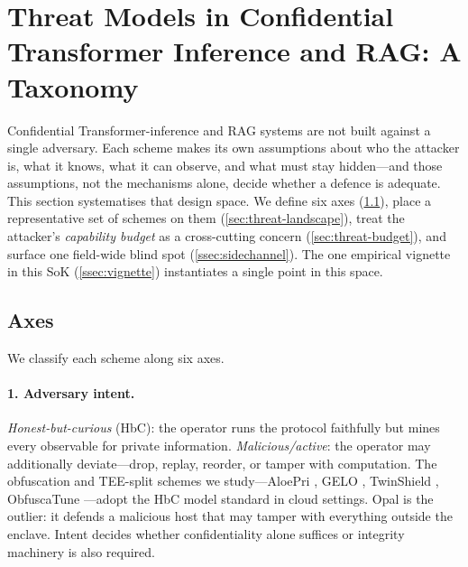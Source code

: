 \section{Threat Models in Confidential Transformer Inference and RAG: A Taxonomy}
\label{sec:threat}


Confidential Transformer-inference and RAG systems are not built against a
single adversary.
Each scheme makes its own assumptions about who the attacker is, what it
knows, what it can observe, and what must stay hidden---and those assumptions,
not the mechanisms alone, decide whether a defence is adequate. This section
systematises that design space. We define six axes
(\cref{sec:threat-axes}), place a representative set of schemes on them
(\cref{sec:threat-landscape}), treat the attacker's \emph{capability budget}
as a cross-cutting concern (\cref{sec:threat-budget}), and surface one
field-wide blind spot (\cref{ssec:sidechannel}). The one empirical vignette in
this SoK (\cref{ssec:vignette}) instantiates a single point in this space.

\subsection{Axes}
\label{sec:threat-axes}

We classify each scheme along six axes.

\paragraph{1. Adversary intent.}
\emph{Honest-but-curious} (HbC): the operator runs the protocol faithfully but
mines every observable for private information. \emph{Malicious/active}: the
operator may additionally deviate---drop, replay, reorder, or tamper with
computation. The obfuscation and TEE-split schemes we study---AloePri
\citep{lin_aloepri}, GELO \citep{belikov_gelo}, TwinShield
\citep{xue_twinshield}, ObfuscaTune \citep{frikha_obfuscatune}---adopt the HbC
model standard in cloud settings. Opal \citep{kaviani_opal} is the outlier: it
defends a malicious host that may tamper with everything outside the enclave.
Intent decides whether confidentiality alone suffices or integrity machinery
is also required.

